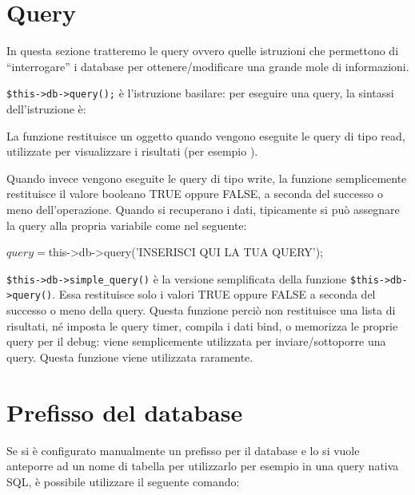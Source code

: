 \section*{Query}
In questa sezione tratteremo le query ovvero quelle istruzioni che permettono di ``interrogare'' i database per ottenere/modificare una grande mole di informazioni.

\verb|$this->db->query();| è l'istruzione basilare: per eseguire una query, la sintassi dell'istruzione è:


La funzione  restituisce un oggetto quando vengono eseguite le query di tipo read, utilizzate per visualizzare i risultati (per esempio ).

Quando invece vengono eseguite le query di tipo write, la funzione semplicemente restituisce il valore booleano TRUE oppure FALSE, a seconda del successo o meno dell'operazione. Quando si recuperano i dati, tipicamente si può assegnare la query alla propria variabile come nel seguente:

\begin{code}
$query = $this->db->query('INSERISCI QUI LA TUA QUERY');
\end{code}

\verb|$this->db->simple_query()| è la versione semplificata della funzione \verb|$this->db->query()|. Essa restituisce solo i valori TRUE oppure FALSE a seconda del successo o meno della query. Questa funzione perciò non restituisce una lista di risultati, né imposta le query timer, compila i dati bind, o memorizza le proprie query per il debug: viene semplicemente utilizzata per inviare/sottoporre una query. Questa funzione viene utilizzata raramente.

\section*{Prefisso del database}
Se si è configurato manualmente un prefisso per il database e lo si vuole anteporre ad un nome di tabella per utilizzarlo per esempio in una query nativa SQL, è possibile utilizzare il seguente comando:


